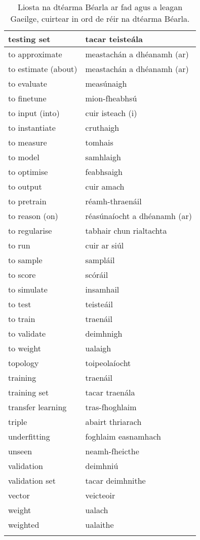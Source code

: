 \documentclass{article}
\begin{document}
\begin{longtable}{|l|l|}
		testing set&tacar teisteála\\ \hline 
		to approximate&meastachán a dhéanamh (ar)\\ \hline 
		to estimate (about)&meastachán a dhéanamh (ar)\\ \hline 
		to evaluate&measúnaigh\\ \hline 
		to finetune&mion-fheabhsú\\ \hline 
		to input (into)&cuir isteach (i)\\ \hline 
		to instantiate&cruthaigh\\ \hline 
		to measure&tomhais\\ \hline 
		to model&samhlaigh\\ \hline 
		to optimise&feabhsaigh\\ \hline 
		to output&cuir amach\\ \hline 
		to pretrain&réamh-thraenáil\\ \hline 
		to reason (on)&réasúnaíocht a dhéanamh (ar)\\ \hline 
		to regularise&tabhair chun rialtachta\\ \hline 
		to run&cuir ar siúl\\ \hline 
		to sample&sampláil\\ \hline 
		to score&scóráil\\ \hline 
		to simulate&insamhail\\ \hline 
		to test&teisteáil\\ \hline 
		to train&traenáil\\ \hline 
		to validate&deimhnigh\\ \hline 
		to weight&ualaigh\\ \hline 
		topology&toipeolaíocht\\ \hline 
		training&traenáil\\ \hline 
		training set&tacar traenála\\ \hline 
		transfer learning&tras-fhoghlaim\\ \hline 
		triple&abairt thriarach\\ \hline 
		underfitting&foghlaim easnamhach\\ \hline 
		unseen&neamh-fheicthe\\ \hline 
		validation&deimhniú\\ \hline 
		validation set&tacar deimhnithe\\ \hline 
		vector&veicteoir\\ \hline 
		weight&ualach\\ \hline 
		weighted&ualaithe\\ \hline 
\caption{Liosta na dtéarma Béarla ar fad agus a leagan Gaeilge, cuirtear in ord de réir na dtéarma Béarla.}
\label{tab-terms-en-ga}
\end{longtable}
\end{document}
